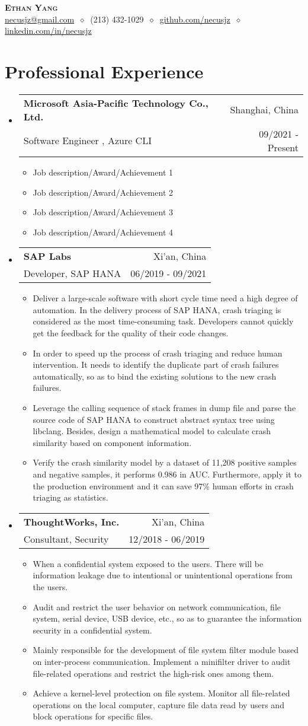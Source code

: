 \documentclass[letterpaper,11pt]{article}
\makeatletter
\newcommand{\cvitem}[1]{
  \item\small{
    {#1\vspace{-2pt}}
  }
}
\newcommand{\cvheading}[4]{
  \vspace{-2pt}\item
    \begin{tabular*}{\textwidth}[t]{l@{\extracolsep{\fill}}r}
      \textbf{#1} & #2 \\
      \small#3 & \small #4 \\
    \end{tabular*}\vspace{-7pt}
}
\newcommand{\cvheadingstart}{\begin{itemize}[leftmargin=0in, label={}]}
\newcommand{\cvheadingend}{\end{itemize}}
\newcommand{\cvitemstart}{\begin{itemize}\justifying}
\newcommand{\cvitemend}{\end{itemize}\vspace{-5pt}}
\newcommand{\cvroman}[1]{\uppercase\expandafter{\romannumeral #1\relax}}
\makeatother
\begin{document}
\begin{center}
  \textbf{\LARGE\scshape Ethan Yang} \\
  \vspace{1pt}\small
  \href{mailto:necusjz@gmail.com}{necusjz@gmail.com}
  $\ \diamond\ $ 
  (213) 432-1029
  $\ \diamond\ $
  \href{https://github.com/necusjz}{github.com/necusjz}
  $\ \diamond\ $
  \href{https://www.linkedin.com/in/necusjz}{linkedin.com/in/necusjz}
\end{center}

\section{Professional Experience}
\cvheadingstart
  \cvheading
    {Microsoft Asia-Pacific Technology Co., Ltd.}{Shanghai, China}
    {Software Engineer \cvroman{2}, Azure CLI}{09/2021 - Present}
  \cvitemstart
    \cvitem{Job description/Award/Achievement 1}
    \cvitem{Job description/Award/Achievement 2}
    \cvitem{Job description/Award/Achievement 3}
    \cvitem{Job description/Award/Achievement 4}
  \cvitemend

  \cvheading
    {SAP Labs}{Xi'an, China}
    {Developer, SAP HANA}{06/2019 - 09/2021}
  \cvitemstart
    \cvitem{Deliver a large-scale software with short cycle time need a high degree of automation. In the delivery process of SAP HANA, crash triaging is considered as the most time-consuming task. Developers cannot quickly get the feedback for the quality of their code changes.}
    \cvitem{In order to speed up the process of crash triaging and reduce human intervention. It needs to identify the duplicate part of crash failures automatically, so as to bind the existing solutions to the new crash failures.}
    \cvitem{Leverage the calling sequence of stack frames in dump file and parse the source code of SAP HANA to construct abstract syntax tree using libclang. Besides, design a mathematical model to calculate crash similarity based on component information.}
    \cvitem{Verify the crash similarity model by a dataset of 11,208 positive samples and negative samples, it performs 0.986 in AUC. Furthermore, apply it to the production environment and it can save 97\% human efforts in crash triaging as statistics.}
  \cvitemend

  \cvheading
    {ThoughtWorks, Inc.}{Xi'an, China}
    {Consultant, Security}{12/2018 - 06/2019}
  \cvitemstart
    \cvitem{When a confidential system exposed to the users. There will be information leakage due to intentional or unintentional operations from the users.}
    \cvitem{Audit and restrict the user behavior on network communication, file system, serial device, USB device, etc., so as to guarantee the information security in a confidential system.}
    \cvitem{Mainly responsible for the development of file system filter module based on inter-process communication. Implement a minifilter driver to audit file-related operations and restrict the high-risk ones among them.}
    \cvitem{Achieve a kernel-level protection on file system. Monitor all file-related operations on the local computer, capture file data read by users and block operations for specific files.}
  \cvitemend
\cvheadingend
\end{document}
